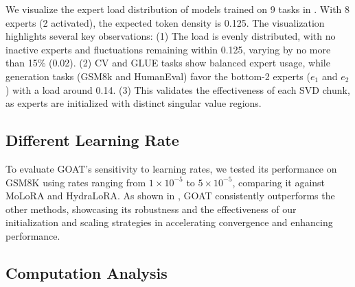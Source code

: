 We visualize the expert load distribution of models trained on 9 tasks in . With 8 experts (2 activated), the expected token density is 0.125. The visualization highlights several key observations:  
(1) The load is evenly distributed, with no inactive experts and fluctuations remaining within 0.125, varying by no more than 15\% (0.02).  
(2) CV and GLUE tasks show balanced expert usage, while generation tasks (GSM8k and HumanEval) favor the bottom-2 experts (\(e_1\) and \(e_2\)) with a load around 0.14.  
(3) This validates the effectiveness of each SVD chunk, as experts are initialized with distinct singular value regions.

\subsection{Different Learning Rate}


\begin{table}[ht]
\vspace{-10pt}
\centering
\caption{Performance comparison of different learning rates. \label{tab:lr}}
\vspace{-10pt}
\end{table}

To evaluate GOAT's sensitivity to learning rates, we tested its performance on GSM8K using rates ranging from \(1 \times 10^{-5}\) to \(5 \times 10^{-5}\), comparing it against MoLoRA and HydraLoRA. As shown in , GOAT consistently outperforms the other methods, showcasing its robustness and the effectiveness of our initialization and scaling strategies in accelerating convergence and enhancing performance.

\subsection{Computation Analysis}

